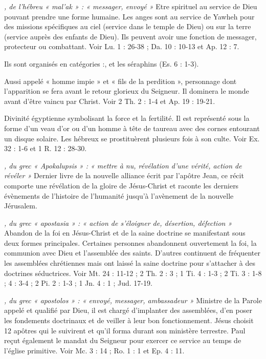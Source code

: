 \begin{multicols}{2}
\textit{, de l'hébreu « mal'ak » : « messager, envoyé »}\newline
Etre spirituel au service de Dieu pouvant prendre une forme humaine. Les anges sont au service de Yawheh pour des missions spécifiques au ciel (service dans le temple de Dieu) ou sur la terre (service auprès des enfants de Dieu). Ils peuvent avoir une fonction de messager, protecteur ou combattant. Voir Lu. 1 : 26-38 ; Da. 10 : 10-13 et Ap. 12 : 7.

Ils sont organisés en catégories :, et les séraphins (Es. 6 : 1-3).

\textit{}\newline
Aussi appelé « homme impie » et « fils de la perdition », personnage dont l'apparition se fera avant le retour glorieux du Seigneur. Il dominera le monde avant d'être vaincu par Christ. Voir 2 Th. 2 : 1-4 et Ap. 19 : 19-21.

\textit{}\newline
Divinité égyptienne symbolisant la force et la fertilité. Il est représenté sous la forme d'un veau d'or ou d'un homme à tête de taureau avec des cornes entourant un disque solaire. Les hébreux se prostituèrent plusieurs fois à son culte. Voir Ex. 32 : 1-6 et 1 R. 12 : 28-30.

\textit{, du grec « Apokalupsis » : « mettre à nu, révélation d'une vérité, action de révéler »}\newline
Dernier livre de la nouvelle alliance écrit par l’apôtre Jean, ce récit comporte une révélation de la gloire de Jésus-Christ et raconte les derniers évènements de l’histoire de l’humanité jusqu'à l'avènement de la nouvelle Jérusalem.

\textit{, du grec « apostasia » : « action de s'éloigner de, désertion, défection »}\newline
Abandon de la foi en Jésus-Christ et de la saine doctrine se manifestant sous deux formes principales. Certaines personnes abandonnent ouvertement la foi, la communion avec Dieu et l’assemblée des saints. D’autres continuent de fréquenter les assemblées chrétiennes mais ont laissé la saine doctrine pour s’attacher à des doctrines séductrices. Voir Mt. 24 : 11-12 ; 2 Th. 2 : 3 ; 1 Ti. 4 : 1-3 ; 2 Ti. 3 : 1-8 ; 4 : 3-4 ; 2 Pi. 2 : 1-3 ; 1 Jn. 4 : 1 ; Jud. 17-19.

\textit{, du grec « apostolos » : « envoyé, messager, ambassadeur »}\newline
Ministre de la Parole appelé et qualifié par Dieu, il est chargé d’implanter des assemblées, d’en poser les fondements doctrinaux et de veiller à leur bon fonctionnement. Jésus choisit 12 apôtres qui le suivirent et qu’il forma durant son ministère terrestre. Paul reçut également le mandat du Seigneur pour exercer ce service au temps de l’église primitive. Voir Mc. 3 : 14 ; Ro. 1 : 1 et Ep. 4 : 11.


\end{multicols}
